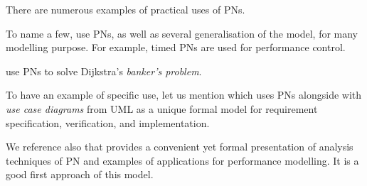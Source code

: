 There are numerous examples of practical uses of \acp{PN}.

To name a few,
\cite{Marsan94} use \acp{PN}, as well as several generalisation of the model, for many modelling purpose.
For example, timed \acp{PN} are used for performance control.

\cite{valk1985residue} use \acp{PN} to solve Dijkstra's \emph{banker's problem}.

To have an example of specific use, let us mention
\cite{koci2016modeling} which uses \acp{PN} alongside with \emph{use case diagrams} from \ac{UML} as a unique formal model for requirement specification, verification, and implementation.

We reference also
\cite{Murata89} that provides a convenient yet formal presentation of analysis techniques of \ac{PN} and examples of applications for performance modelling.
It is a good first approach of this model.
